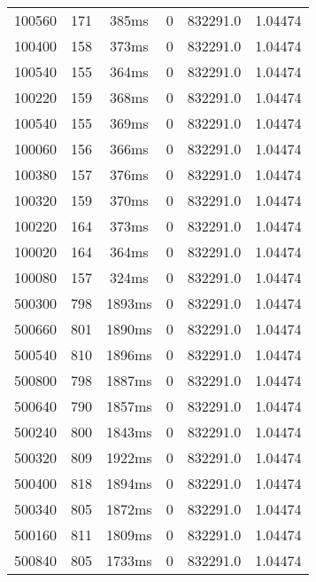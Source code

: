 \documentclass[./main.tex]{subfiles}
\begin{document}
\begin{table}
\begin{tabular}{ c | c | c | c | c | c }
        \hline
        \rowcolor{lightgray} 100560 & 171 & 385ms & 0 & 832291.0 & 1.04474 \\
        \rowcolor{lightgray} 100400 & 158 & 373ms & 0 & 832291.0 & 1.04474 \\
        \rowcolor{lightgray} 100540 & 155 & 364ms & 0 & 832291.0 & 1.04474 \\
        \rowcolor{lightgray} 100220 & 159 & 368ms & 0 & 832291.0 & 1.04474 \\
        \rowcolor{lightgray} 100540 & 155 & 369ms & 0 & 832291.0 & 1.04474 \\
        \rowcolor{lightgray} 100060 & 156 & 366ms & 0 & 832291.0 & 1.04474 \\
        \rowcolor{lightgray} 100380 & 157 & 376ms & 0 & 832291.0 & 1.04474 \\
        \rowcolor{lightgray} 100320 & 159 & 370ms & 0 & 832291.0 & 1.04474 \\
        \rowcolor{lightgray} 100220 & 164 & 373ms & 0 & 832291.0 & 1.04474 \\
        \rowcolor{lightgray} 100020 & 164 & 364ms & 0 & 832291.0 & 1.04474 \\
        \rowcolor{lightgray} 100080 & 157 & 324ms & 0 & 832291.0 & 1.04474 \\
        \hline
        \rowcolor{lightgray} 500300 & 798 & 1893ms & 0 & 832291.0 & 1.04474 \\
        \rowcolor{lightgray} 500660 & 801 & 1890ms & 0 & 832291.0 & 1.04474 \\
        \rowcolor{lightgray} 500540 & 810 & 1896ms & 0 & 832291.0 & 1.04474 \\
        \rowcolor{lightgray} 500800 & 798 & 1887ms & 0 & 832291.0 & 1.04474 \\
        \rowcolor{lightgray} 500640 & 790 & 1857ms & 0 & 832291.0 & 1.04474 \\
        \rowcolor{lightgray} 500240 & 800 & 1843ms & 0 & 832291.0 & 1.04474 \\
        \rowcolor{lightgray} 500320 & 809 & 1922ms & 0 & 832291.0 & 1.04474 \\
        \rowcolor{lightgray} 500400 & 818 & 1894ms & 0 & 832291.0 & 1.04474 \\
        \rowcolor{lightgray} 500340 & 805 & 1872ms & 0 & 832291.0 & 1.04474 \\
        \rowcolor{lightgray} 500160 & 811 & 1809ms & 0 & 832291.0 & 1.04474 \\
        \rowcolor{lightgray} 500840 & 805 & 1733ms & 0 & 832291.0 & 1.04474 \\

\end{tabular}
\end{table}
\end{document}
